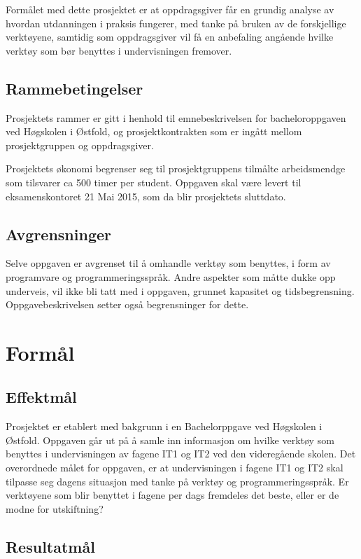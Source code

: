\documentclass[norsk,a4paper,12pt]{article}
\begin{document}
Formålet med dette prosjektet er at oppdragsgiver får en grundig analyse av hvordan  utdanningen i praksis fungerer, med tanke på bruken av de forskjellige verktøyene, samtidig som oppdragsgiver vil få en anbefaling angående hvilke verktøy som bør benyttes i undervisningen fremover.

\subsection{Rammebetingelser}

Prosjektets rammer er gitt i henhold til emnebeskrivelsen for bacheloroppgaven ved Høgskolen i Østfold, og prosjektkontrakten som er ingått mellom prosjektgruppen og oppdragsgiver. 

Prosjektets økonomi begrenser seg til prosjektgruppens tilmålte arbeidsmendge som tilsvarer ca 500 timer per student. Oppgaven skal være levert til eksamenskontoret 21 Mai 2015, som da blir prosjektets sluttdato. 

\subsection{Avgrensninger}

Selve oppgaven er avgrenset til å omhandle verktøy som benyttes, i form av programvare og programmeringsspråk. Andre aspekter som måtte dukke opp underveis, vil ikke bli tatt med i oppgaven, grunnet kapasitet og tidsbegrensning. Oppgavebeskrivelsen setter også begrensninger for dette.

\section{Formål}

\subsection{Effektmål}

Prosjektet er etablert med bakgrunn i en Bachelorppgave ved Høgskolen i Østfold. Oppgaven går ut på å samle inn informasjon om hvilke verktøy som benyttes i undervisningen av fagene IT1 og IT2 ved den videregående skolen. Det overordnede målet for oppgaven, er at undervisningen i fagene IT1 og IT2 skal tilpasse seg dagens situasjon med tanke på verktøy og programmeringsspråk. Er verktøyene som blir benyttet i fagene per dags fremdeles det beste, eller er de modne for utskiftning? 

\subsection{Resultatmål}
\end{document}
